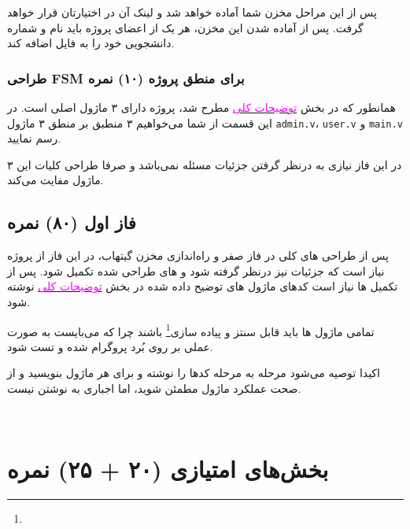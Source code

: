 \documentclass[]{article}
\begin{document}
پس از این مراحل مخزن شما آماده خواهد شد و لینک آن در اختیارتان قرار خواهد گرفت. پس از آماده شدن این مخزن، هر یک از اعضای پروژه باید نام و شماره دانشجویی خود را به فایل  اضافه کند.






\subsubsection*{{\titr طراحی FSM برای منطق پروژه} (۱۰) نمره}
\label{subsubsec:fsm}

همانطور که در بخش 
\hyperref[sec:detail]{\textcolor{magenta}{توضیحات کلی}}
مطرح شد، پروژه دارای ۳ ماژول اصلی است. در این قسمت از شما می‌خواهیم ۳  منطبق بر منطق ۳ ماژول \texttt{admin.v}، \texttt{user.v} و \texttt{main.v} رسم نمایید.

در این فاز نیازی به درنظر گرفتن جزئیات مسئله نمی‌باشد و صرفا طراحی کلیات این ۳ ماژول مفایت می‌کند.





\subsection*{{\titr فاز اول} (۸۰) نمره}
پس از طراحی  های کلی در فاز صفر و راه‌اندازی مخزن گیتهاب، در این فاز از پروژه نیاز است که جزئیات نیز درنظر گرفته شود و  های طراحی شده تکمیل شود. پس از تکمیل  ها نیاز است کدهای  ماژول های توضیح داده شده در بخش 
\hyperref[sec:detail]{\textcolor{magenta}{توضیحات کلی}}
نوشته شود. 

تمامی ماژول ها باید قابل سنتز و پیاده سازی\footnote{} باشند چرا که می‌بایست به صورت عملی بر روی بُرد پروگرام شده و تست شود.

اکیدا توصیه می‌شود مرحله به مرحله کد‌ها را نوشته و برای هر ماژول  بنویسید و از صحت عملکرد ماژول مطمئن شوید، اما اجباری به نوشتن  نیست.



\newpage
\Large \textbf{\\
}



\section*{{\titr بخش‌های امتیازی} (۲۰ + ۲۵) نمره}
\end{document}
